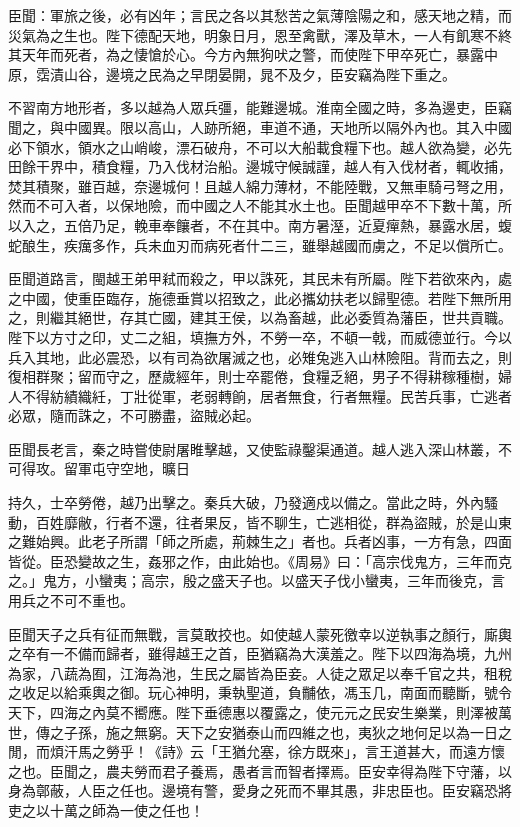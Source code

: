 \begin{pinyinscope}
臣聞：軍旅之後，必有凶年；言民之各以其愁苦之氣薄陰陽之和，感天地之精，而災氣為之生也。陛下德配天地，明象日月，恩至禽獸，澤及草木，一人有飢寒不終其天年而死者，為之悽愴於心。今方內無狗吠之警，而使陛下甲卒死亡，暴露中原，霑漬山谷，邊境之民為之早閉晏開，晁不及夕，臣安竊為陛下重之。

不習南方地形者，多以越為人眾兵彊，能難邊城。淮南全國之時，多為邊吏，臣竊聞之，與中國異。限以高山，人跡所絕，車道不通，天地所以隔外內也。其入中國必下領水，領水之山峭峻，漂石破舟，不可以大船載食糧下也。越人欲為變，必先田餘干界中，積食糧，乃入伐材治船。邊城守候誠謹，越人有入伐材者，輒收捕，焚其積聚，雖百越，奈邊城何！且越人綿力薄材，不能陸戰，又無車騎弓弩之用，然而不可入者，以保地險，而中國之人不能其水土也。臣聞越甲卒不下數十萬，所以入之，五倍乃足，輓車奉饟者，不在其中。南方暑溼，近夏癉熱，暴露水居，蝮蛇酿生，疾癘多作，兵未血刃而病死者什二三，雖舉越國而虜之，不足以償所亡。

臣聞道路言，閩越王弟甲弒而殺之，甲以誅死，其民未有所屬。陛下若欲來內，處之中國，使重臣臨存，施德垂賞以招致之，此必攜幼扶老以歸聖德。若陛下無所用之，則繼其絕世，存其亡國，建其王侯，以為畜越，此必委質為藩臣，世共貢職。陛下以方寸之印，丈二之組，填撫方外，不勞一卒，不頓一戟，而威德並行。今以兵入其地，此必震恐，以有司為欲屠滅之也，必雉兔逃入山林險阻。背而去之，則復相群聚；留而守之，歷歲經年，則士卒罷倦，食糧乏絕，男子不得耕稼種樹，婦人不得紡績織紝，丁壯從軍，老弱轉餉，居者無食，行者無糧。民苦兵事，亡逃者必眾，隨而誅之，不可勝盡，盜賊必起。

臣聞長老言，秦之時嘗使尉屠睢擊越，又使監祿鑿渠通道。越人逃入深山林叢，不可得攻。留軍屯守空地，曠日

持久，士卒勞倦，越乃出擊之。秦兵大破，乃發適戍以備之。當此之時，外內騷動，百姓靡敝，行者不還，往者果反，皆不聊生，亡逃相從，群為盜賊，於是山東之難始興。此老子所謂「師之所處，荊棘生之」者也。兵者凶事，一方有急，四面皆從。臣恐變故之生，姦邪之作，由此始也。《周易》曰：「高宗伐鬼方，三年而克之。」鬼方，小蠻夷；高宗，殷之盛天子也。以盛天子伐小蠻夷，三年而後克，言用兵之不可不重也。

臣聞天子之兵有征而無戰，言莫敢挍也。如使越人蒙死徼幸以逆執事之顏行，廝輿之卒有一不備而歸者，雖得越王之首，臣猶竊為大漢羞之。陛下以四海為境，九州為家，八蔬為囿，江海為池，生民之屬皆為臣妾。人徒之眾足以奉千官之共，租稅之收足以給乘輿之御。玩心神明，秉執聖道，負黼依，馮玉几，南面而聽斷，號令天下，四海之內莫不嚮應。陛下垂德惠以覆露之，使元元之民安生樂業，則澤被萬世，傳之子孫，施之無窮。天下之安猶泰山而四維之也，夷狄之地何足以為一日之閒，而煩汗馬之勞乎！《詩》云「王猶允塞，徐方既來」，言王道甚大，而遠方懷之也。臣聞之，農夫勞而君子養焉，愚者言而智者擇焉。臣安幸得為陛下守藩，以身為鄣蔽，人臣之任也。邊境有警，愛身之死而不畢其愚，非忠臣也。臣安竊恐將吏之以十萬之師為一使之任也！


\end{pinyinscope}
